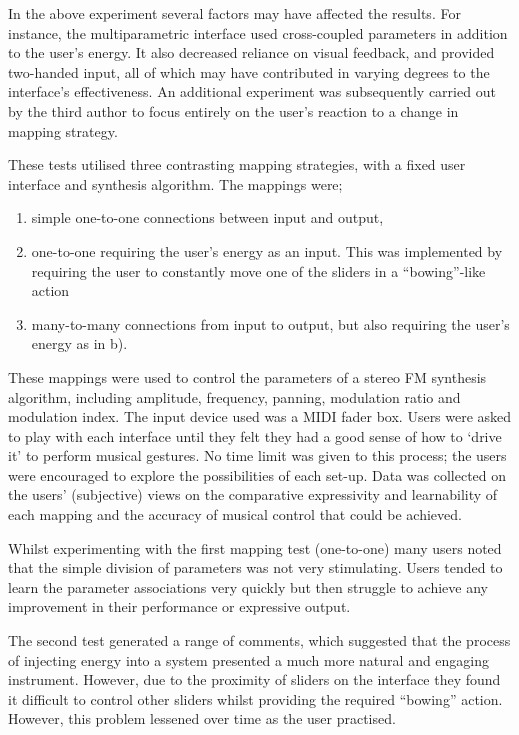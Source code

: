 In the above experiment several factors may have affected the results.  For
instance, the multiparametric interface used cross-coupled parameters in addition
to the user's energy. It also decreased reliance on visual feedback, and provided
two-handed input, all of which may have contributed in varying degrees to the
interface's effectiveness.  An additional experiment was subsequently carried out
by the third author to focus entirely on the user's reaction to a change in
mapping strategy.

These tests utilised three contrasting mapping strategies, with a fixed user
interface and synthesis algorithm. The mappings were;

\begin{enumerate}
	\item simple one-to-one connections between input and output,

	\item one-to-one requiring the user's energy as an input.  This was implemented by
requiring the user to constantly move one of the sliders in a ``bowing''-like
action

	\item many-to-many connections from input to output, but also requiring the user's 
energy as in b).

\end{enumerate}

These mappings were used to control the parameters of a stereo FM synthesis
algorithm, including amplitude, frequency, panning, modulation ratio and
modulation index. The input device used was a MIDI fader box.  Users were asked
to play with each interface until they felt they had a good sense of how to
`drive it' to perform musical gestures.  No time limit was given to this process;
the users were encouraged to explore the possibilities of each set-up.  Data was
collected on the users' (subjective) views on the comparative expressivity and
learnability of each mapping and the accuracy of musical control that could be
achieved.

Whilst experimenting with the first mapping test (one-to-one) many users noted
that the simple division of parameters was not very stimulating. Users tended to
learn the parameter associations very quickly but then struggle to achieve any
improvement in their performance or expressive output.

The second test generated a range of comments, which suggested that the process
of injecting energy into a system presented a much more natural and engaging
instrument.  However, due to the proximity of sliders on the interface they found
it difficult to control other sliders whilst providing the required ``bowing''
action.  However, this problem lessened over time as the user practised.

